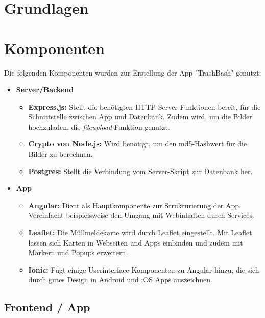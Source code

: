 \documentclass[a4paper, 11pt, DIV=11, listof=numbered, numbers=noenddot]{scrartcl}
\begin{document}
	\section{Grundlagen}
	\blindtext

	\section{Komponenten}
	Die folgenden Komponenten wurden zur Erstellung der App "TrashBash" genutzt:
	\begin {itemize}
	\item \textbf{Server/Backend}
		\begin {itemize}
			\item \textbf{Express.js:} Stellt die benötigten HTTP-Server Funktionen bereit, für die Schnittstelle zwischen App und Datenbank. Zudem wird, um die Bilder hochzuladen, die \textit{fileupload}-Funktion genutzt.
			\item \textbf{Crypto von Node.js:} Wird benötigt, um den md5-Hashwert für die Bilder zu berechnen.
			\item \textbf{Postgres:} Stellt die Verbindung vom Server-Skript zur Datenbank her.
		\end {itemize}
	\item \textbf{App}
		\begin {itemize}
		\item \textbf{Angular:} Dient als Hauptkomponente zur Strukturierung der App. Vereinfacht beispielsweise den Umgang mit Webinhalten durch Services.
		\item \textbf{Leaflet:} Die Müllmeldekarte wird durch Leaflet eingestellt. Mit Leaflet lassen sich Karten in Webseiten und Apps einbinden und zudem mit Markern und Popups erweitern.
		\item \textbf{Ionic:} Fügt einige Userinterface-Komponenten zu Angular hinzu, die sich durch gutes Design in Android und iOS Apps auszeichnen.
		\end {itemize}
	\end {itemize}

	\subsection{Frontend / App}
\end{document}

